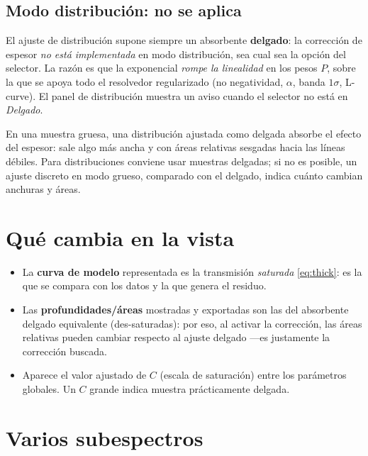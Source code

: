 \subsection{Modo distribución: no se aplica}
El ajuste de distribución supone siempre un absorbente \textbf{delgado}: la
corrección de espesor \emph{no está implementada} en modo distribución, sea cual
sea la opción del selector. La razón es que la exponencial \emph{rompe la
linealidad} en los pesos $P$, sobre la que se apoya todo el resolvedor regularizado
(no negatividad, $\alpha$, banda $1\sigma$, L-curve). El panel de distribución
muestra un aviso cuando el selector no está en \emph{Delgado}.

En una muestra gruesa, una distribución ajustada como delgada absorbe el efecto
del espesor: sale algo más ancha y con áreas relativas sesgadas hacia las líneas
débiles. Para distribuciones conviene usar muestras delgadas; si no es posible,
un ajuste discreto en modo grueso, comparado con el delgado, indica cuánto
cambian anchuras y áreas.

\section{Qué cambia en la vista}

\begin{itemize}[leftmargin=*]
  \item La \textbf{curva de modelo} representada es la transmisión \emph{saturada}
        \eqref{eq:thick}: es la que se compara con los datos y la que genera el
        residuo.
  \item Las \textbf{profundidades/áreas} mostradas y exportadas son las del
        absorbente delgado equivalente (des-saturadas): por eso, al activar la
        corrección, las áreas relativas pueden cambiar respecto al ajuste delgado
        —es justamente la corrección buscada.
  \item Aparece el valor ajustado de $C$ (escala de saturación) entre los
        parámetros globales. Un $C$ grande indica muestra prácticamente delgada.
\end{itemize}

\section{Varios subespectros}

